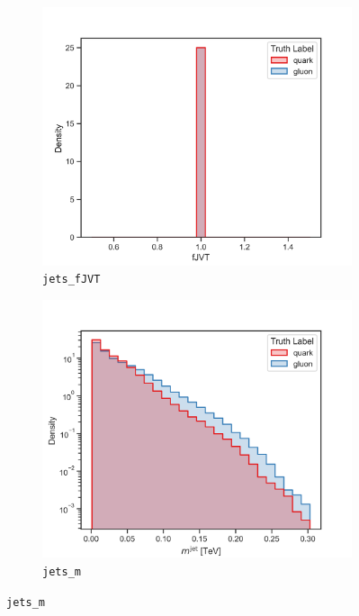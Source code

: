 \begin{figure}[!htb]
	\centering
	\begin{subfigure}[t]{0.49\textwidth}
		\includegraphics[width=1\textwidth]{src/plots/distributions/highlevel/jets_fJVT.png}
		\caption{\texttt{jets\_fJVT}}
		\label{fig:highlevel_24}
	\end{subfigure}
	\begin{subfigure}[t]{0.49\textwidth}
		\includegraphics[width=1\textwidth]{src/plots/distributions/highlevel/jets_m.png}
		\caption{\texttt{jets\_m}}
		\label{fig:highlevel_25}

\end{subfigure}
\end{figure}
